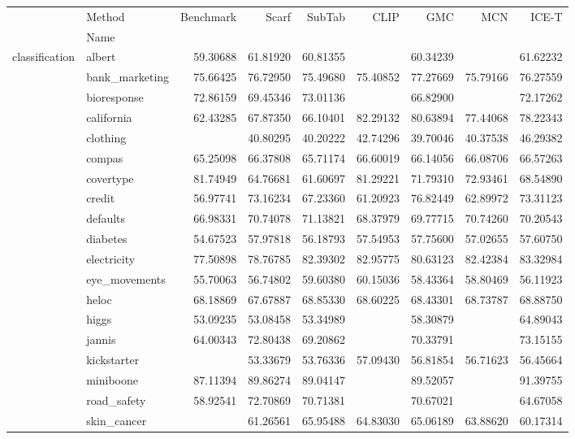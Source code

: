 \begin{tabular}{llrrrrrrr}
\toprule
 & Method & Benchmark & Scarf & SubTab & CLIP & GMC & MCN & ICE-T \\
 & Name &  &  &  &  &  &  &  \\
\midrule
\multirow[c]{21}{*}{classification} & albert & 59.30688 & 61.81920 & 60.81355 &  & 60.34239 &  & 61.62232 \\
 & bank_marketing & 75.66425 & 76.72950 & 75.49680 & 75.40852 & 77.27669 & 75.79166 & 76.27559 \\
 & bioresponse & 72.86159 & 69.45346 & 73.01136 &  & 66.82900 &  & 72.17262 \\
 & california & 62.43285 & 67.87350 & 66.10401 & 82.29132 & 80.63894 & 77.44068 & 78.22343 \\
 & clothing &  & 40.80295 & 40.20222 & 42.74296 & 39.70046 & 40.37538 & 46.29382 \\
 & compas & 65.25098 & 66.37808 & 65.71174 & 66.60019 & 66.14056 & 66.08706 & 66.57263 \\
 & covertype & 81.74949 & 64.76681 & 61.60697 & 81.29221 & 71.79310 & 72.93461 & 68.54890 \\
 & credit & 56.97741 & 73.16234 & 67.23360 & 61.20923 & 76.82449 & 62.89972 & 73.31123 \\
 & defaults & 66.98331 & 70.74078 & 71.13821 & 68.37979 & 69.77715 & 70.74260 & 70.20543 \\
 & diabetes & 54.67523 & 57.97818 & 56.18793 & 57.54953 & 57.75600 & 57.02655 & 57.60750 \\
 & electricity & 77.50898 & 78.76785 & 82.39302 & 82.95775 & 80.63123 & 82.42384 & 83.32984 \\
 & eye_movements & 55.70063 & 56.74802 & 59.60380 & 60.15036 & 58.43364 & 58.80469 & 56.11923 \\
 & heloc & 68.18869 & 67.67887 & 68.85330 & 68.60225 & 68.43301 & 68.73787 & 68.88750 \\
 & higgs & 53.09235 & 53.08458 & 53.34989 &  & 58.30879 &  & 64.89043 \\
 & jannis & 64.00343 & 72.80438 & 69.20862 &  & 70.33791 &  & 73.15155 \\
 & kickstarter &  & 53.33679 & 53.76336 & 57.09430 & 56.81854 & 56.71623 & 56.45664 \\
 & miniboone & 87.11394 & 89.86274 & 89.04147 &  & 89.52057 &  & 91.39755 \\
 & road_safety & 58.92541 & 72.70869 & 70.71381 &  & 70.67021 &  & 64.67058 \\
 & skin_cancer &  & 61.26561 & 65.95488 & 64.83030 & 65.06189 & 63.88620 & 60.17314 \\

\end{tabular}
